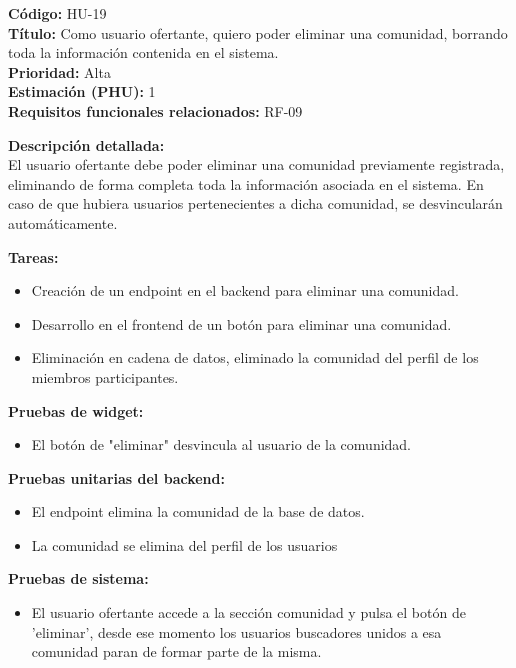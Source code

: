 \begin{tarjetaHU}
\textbf{Código:} HU-19 \\
\textbf{Título:} Como usuario ofertante, quiero poder eliminar una comunidad, borrando toda la información contenida en el sistema. \\
\textbf{Prioridad:} Alta \\
\textbf{Estimación (PHU):} 1 \\
\textbf{Requisitos funcionales relacionados:} RF-09

\vspace{0.5em}
\textbf{Descripción detallada:} \\
El usuario ofertante debe poder eliminar una comunidad previamente registrada, eliminando de forma completa toda la información asociada en el sistema. En caso de que hubiera usuarios pertenecientes a dicha comunidad, se desvincularán automáticamente.

\vspace{0.5em}
\textbf{Tareas:}
\begin{itemize}[left=0pt]
  \item Creación de un endpoint en el backend para eliminar una comunidad. 
  \item Desarrollo en el frontend de un botón para eliminar una comunidad.
  \item Eliminación en cadena de datos, eliminado la comunidad del perfil de los miembros participantes.
\end{itemize}

\vspace{0.5em}
\textbf{Pruebas de widget:}
\begin{itemize}[left=0pt]
  \item El botón de "eliminar" desvincula al usuario de la comunidad.
\end{itemize}
\textbf{Pruebas unitarias del backend:}
\begin{itemize}[left=0pt]
  \item El endpoint elimina la comunidad de la base de datos.
  \item La comunidad se elimina del perfil de los usuarios
\end{itemize}
\textbf{Pruebas de sistema:}
\begin{itemize}[left=0pt]
    \item El usuario ofertante accede a la sección comunidad y pulsa el botón de 'eliminar', desde ese momento los usuarios buscadores unidos a esa comunidad paran de formar parte de la misma.
\end{itemize}
\end{tarjetaHU}

